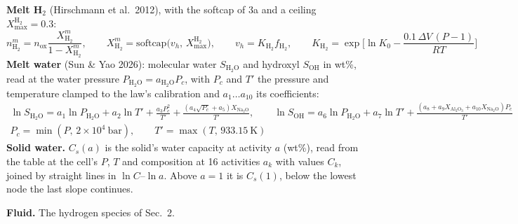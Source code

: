 \documentclass[11pt]{article}
\newcommand{\fHt}{f_{\mathrm{H_2}}}
\newcommand{\aw}{a_{\mathrm{H_2O}}}
\newcommand{\nox}{n_{\mathrm{ox}}}
\newcommand{\Xm}[1]{X^{m}_{\mathrm{#1}}}
\begin{document}
{\textbf{Melt H$_2$} (Hirschmann et al.\ 2012), with the softcap of 3a and a ceiling $X^{\mathrm H_2}_{\max}=0.3$:
\begin{equation}
  n^{m}_{\mathrm{H_2}}=\nox\frac{\Xm{H_2}}{1-\Xm{H_2}},\qquad
  \Xm{H_2}=\mathrm{softcap}\big(v_h,\,X^{\mathrm H_2}_{\max}\big),\qquad v_h=K_{\mathrm{H_2}}\fHt,\qquad
  K_{\mathrm{H_2}}=\exp\Big[\ln K_0-\frac{0.1\,\Delta V\,(P-1)}{RT}\Big]
\end{equation}
\textbf{Melt water} (Sun \& Yao 2026): molecular water $S_{\mathrm{H_2O}}$ and hydroxyl $S_{\mathrm{OH}}$ in wt\%, read at the water pressure $P_{\mathrm{H_2O}}=\aw P_c$, with $P_c$ and $T'$ the pressure and temperature clamped to the law's calibration and $a_1\dots a_{10}$ its coefficients:
\begin{gather}
  \ln S_{\mathrm{H_2O}}=a_1\ln P_{\mathrm{H_2O}}+a_2\ln T'+\frac{a_3P_c^{2}}{T'}+\frac{(a_4\sqrt{P_c}+a_5)X_{\mathrm{Na_2O}}}{T'},\qquad
  \ln S_{\mathrm{OH}}=a_6\ln P_{\mathrm{H_2O}}+a_7\ln T'+\frac{(a_8+a_9X_{\mathrm{Al_2O_3}}+a_{10}X_{\mathrm{Na_2O}})P_c}{T'}\nonumber\\
  P_c=\min(P,\,2\times10^{4}\ \mathrm{bar}),\qquad T'=\max(T,\,933.15\ \mathrm K)
\end{gather}
\textbf{Solid water.} $C_s(a)$ is the solid's water capacity at activity $a$ (wt\%), read from the table at the cell's $P$, $T$ and composition at 16 activities $a_k$ with values $C_k$, joined by straight lines in $\ln C$--$\ln a$. Above $a=1$ it is $C_s(1)$, below the lowest node the last slope continues.

\textbf{Fluid.} The hydrogen species of Sec.~2.
}

\vspace*{\fill}
\clearpage
\end{document}
